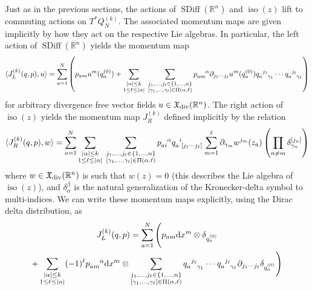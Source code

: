 \documentclass[12pt]{amsart}
\newcommand{\R}{\ensuremath{\mathbb{R}}}
\newcommand{\dx}{\ensuremath{\textrm{d}x}}
\DeclareMathOperator{\SDiff}{SDiff}
\DeclareMathOperator{\iso}{iso}
\begin{document}
  Just as in the previous sections, the actions of $\SDiff(\R^n)$ and $\iso(z)$ lift to commuting actions on $T^*Q_N^{(k)}$.
  The associated momentum maps are given implicitly by how they act on the respective Lie algebras.
  In particular, the left action of $\SDiff(\R^n)$ yields the momentum map
  \begin{equation*}
  	\langle J_L^{(k)}(q,p) , u \rangle =
	\sum_{a=1}^N \left( p_{am} u^m(q^{(0)}_a) +
    \sum_{\substack{ |\alpha| \leq k \\ 1 \leq \ell \leq |\alpha| }} \;
		\sum_{
			\substack{
				j_1,\dots,j_\ell \in \{1,\dots,n\} \\
				[\gamma_1,\dots,\gamma_\ell] \in \Pi(\alpha,\ell)
				}
			}
			p\indices{_a_m^\alpha} \partial_{j_1 \cdots j_\ell}u^m (q^{(0)}_a)
      q\indices{_a^{j_1}_{\gamma_1}} \cdots
      q\indices{_a^{j_\ell}_{\gamma_\ell}}
			\right)
  \end{equation*}
  for arbitrary divergence free vector fields $u \in \mathfrak{X}_{\rm div}(\R^n)$.
  The right action of $\iso(z)$ yields the momentum map $J_R^{(k)}$ defined implicitly by the relation
  \begin{equation*}
    \langle J_R^{(k)}(q,p) , w \rangle = \sum_{a=1}^N
    \sum_{\substack{ |\alpha| \leq k \\ 1 \leq \ell \leq |\alpha| }} \;
		\sum_{
			\substack{
				j_1,\dots,j_\ell \in \{1,\dots,n\} \\
				[\gamma_1,\dots,\gamma_\ell] \in \Pi(\alpha,\ell)
				}
			}
			p\indices{_a_i^\alpha} q\indices{_a^{i}_{[j_1 \cdots j_\ell]}}
      \sum_{m=1}^\ell  \partial_{\gamma_m} w^{j_m}(z_a) \left( \prod_{n \neq m}  \delta_{\gamma_n}^{[j_n]} \right)
  \end{equation*}
  where $w \in \mathfrak{X}_{\rm div}(\R^n)$ is such that $w(z) = 0$ (this describes the Lie algebra of $\iso(z)$),
  and $\delta_\alpha^\beta$ is the natural generalization of the Kronecker-delta symbol to multi-indices.
  We can write these momentum maps explicitly, using the Dirac delta distribution, as
  \begin{multline*}
    J_L^{(k)}(q,p) =
    \sum_{a=1}^N \Bigg(
    p_{am} \dx^m \otimes \delta_{q^{(0)}_a} \\
  + \sum_{\substack{ |\alpha| \leq k \\ 1 \leq \ell \leq |\alpha| }}
    (-1)^\ell p\indices{_{am}^\alpha} \dx^m \otimes
      \sum_{\substack{
          j_1,\dots,j_\ell \in \{1,\dots,n\} \\
          [\gamma_1,\dots,\gamma_\ell] \in \Pi( \alpha,\ell)
          }
        }
      q\indices{_a^{j_1}_{\gamma_1}} \cdots q\indices{_a^{j_\ell}_{\gamma_\ell}}
      \partial_{j_1 \cdots j_\ell} \delta_{q^{(0)}_a}
      \Bigg)
  \end{multline*}
\end{document}
